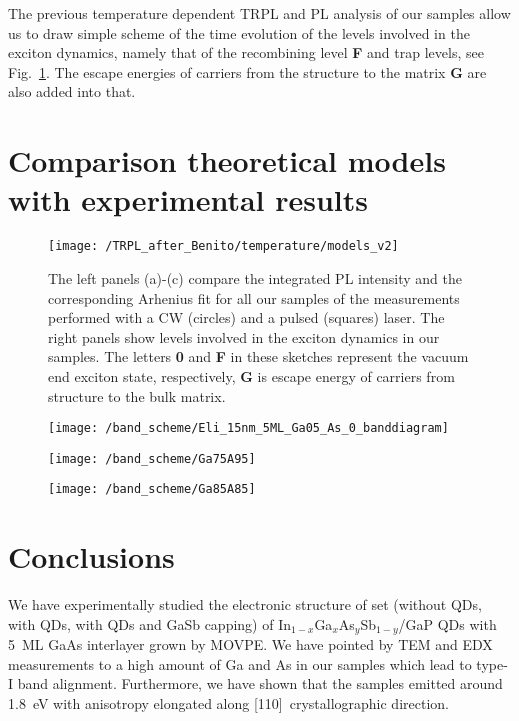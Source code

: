The previous temperature dependent TRPL and PL analysis of our samples allow us to draw simple scheme of the time evolution of the levels involved in the exciton dynamics, namely that of the recombining level \textbf{F} and trap levels, see Fig.~\ref{fig:Arrhenius_PLandTRPL}. The escape energies of carriers from the structure to the matrix \textbf{G} are also added into that. 


\section{Comparison theoretical models with experimental results} \label{sec:TUB_results}

\begin{figure}
	\centering
	\texttt{[image: /TRPL\_after\_Benito/temperature/models\_v2]} %
	\caption{The left panels (a)-(c) compare the integrated PL intensity and the corresponding Arhenius fit for all our samples of the measurements performed with a CW (circles) and a pulsed (squares) laser. The right panels show levels involved in the exciton dynamics in our samples. The letters \textbf{0} and \textbf{F} in these sketches represent the vacuum end exciton state, respectively, \textbf{G} is escape energy of carriers from structure to the bulk matrix.}
	\label{fig:Arrhenius_PLandTRPL}
\end{figure}
\newpage 


\begin{figure}
	\centering
	\texttt{[image: /band\_scheme/Eli\_15nm\_5ML\_Ga05\_As\_0\_banddiagram]} %
	\caption{}
	\label{fig:Band_scheme_wo}
\end{figure}


\begin{figure}
	\centering
	\texttt{[image: /band\_scheme/Ga75A95]}%
	\caption{}
	\label{fig:Band_scheme_with}
\end{figure}

\begin{figure}
	\centering
	\texttt{[image: /band\_scheme/Ga85A85]}%
	\caption{}
	\label{fig:Band_scheme_cap}
\end{figure}

\section{Conclusions}
We have experimentally studied the electronic structure of set (without QDs, with QDs, with QDs and GaSb capping) of In$_{1-x}$Ga$_{x}$As$_y$Sb$_{1-y}$/GaP QDs with 5~ML GaAs interlayer grown by MOVPE. We have pointed by TEM and EDX measurements to a high amount of Ga and As in our samples which lead to type-I band alignment. Furthermore, we have shown that the samples emitted around 1.8~eV with anisotropy elongated along [110]~crystallographic direction.   %

{\color{green}{Podívej se i zpět do textu, přibyly tam modre podbarvene texty
	
	Zmínit, že se povedlo narůst 5ML GaAs vrstvu}} {\color{red}{CO DÁL???}}